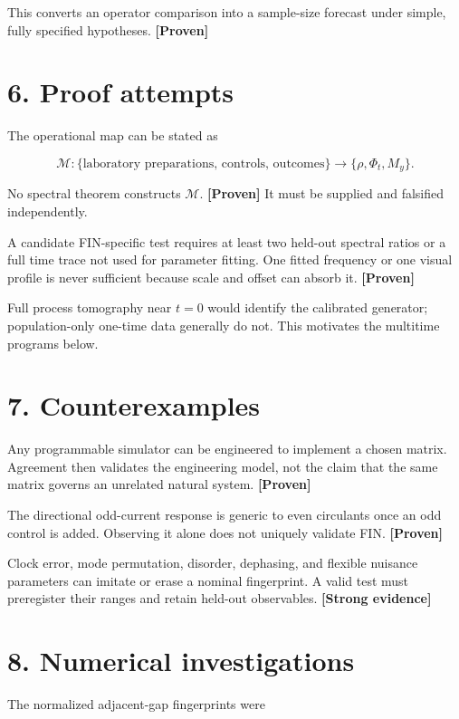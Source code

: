 \documentclass[11pt,a4paper,openany]{report}
\newcommand{\statusProven}{\textcolor{fingreen}{[Proven]}}
\newcommand{\statusStrong}{\textcolor{finblue}{[Strong evidence]}}
\begin{document}
This converts an operator comparison into a sample-size forecast under simple, fully specified hypotheses. \textbf{\statusProven{}}

\section{6. Proof attempts}

The operational map can be stated as

\[
\mathcal M:
\{\text{laboratory preparations, controls, outcomes}\}
\longrightarrow
\{\rho,\Phi_t,M_y\}.
\]

No spectral theorem constructs \(\mathcal M\). \textbf{\statusProven{}} It must be supplied and falsified independently.

A candidate FIN-specific test requires at least two held-out spectral ratios or a full time trace not used for parameter fitting. One fitted frequency or one visual profile is never sufficient because scale and offset can absorb it. \textbf{\statusProven{}}

Full process tomography near \(t=0\) would identify the calibrated generator; population-only one-time data generally do not. This motivates the multitime programs below.

\section{7. Counterexamples}

Any programmable simulator can be engineered to implement a chosen matrix. Agreement then validates the engineering model, not the claim that the same matrix governs an unrelated natural system. \textbf{\statusProven{}}

The directional odd-current response is generic to even circulants once an odd control is added. Observing it alone does not uniquely validate FIN. \textbf{\statusProven{}}

Clock error, mode permutation, disorder, dephasing, and flexible nuisance parameters can imitate or erase a nominal fingerprint. A valid test must preregister their ranges and retain held-out observables. \textbf{\statusStrong{}}

\section{8. Numerical investigations}

The normalized adjacent-gap fingerprints were
\end{document}
